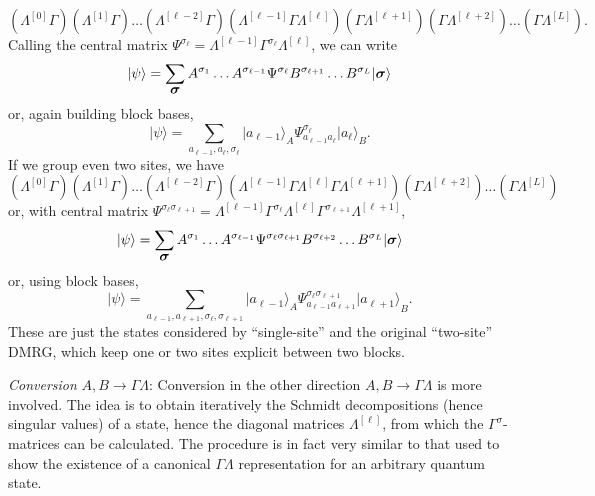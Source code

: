 \documentclass[a4paper,10pt,oneside,onecolumn,1p,times]{elsarticle}
\newcommand{\ket}[1]{\mbox{$| #1  \rangle$}}
\newcommand{\fat}[1]{\mbox{\boldmath$#1$\unboldmath}}	%
\begin{document}
\begin{equation}
(\Lambda^{[0]}\Gamma)(\Lambda^{[1]}\Gamma)\ldots(\Lambda^{[\ell-2]}\Gamma)(\Lambda^{[\ell-1]}\Gamma \Lambda^{[\ell]}) (\Gamma\Lambda^{[\ell+1]})(\Gamma\Lambda^{[\ell+2]}) \ldots (\Gamma\Lambda^{[L]}) .
\end{equation}
Calling the central matrix $\Psi^{\sigma_\ell}= \Lambda^{[\ell-1]}\Gamma^{\sigma_\ell} \Lambda^{[\ell]}$, we can write 
\begin{equation}
\ket{\psi} = \sum_{\fat{\sigma}} A^{\sigma_1} \ldots A^{\sigma_{\ell-1}} \Psi^{\sigma_\ell} B^{\sigma_{\ell+1}} \ldots B^{\sigma_L}
\ket{\fat{\sigma}}
\end{equation}
or, again building block bases,
\begin{equation}
\ket{\psi} = \sum_{a_{\ell-1},a_{\ell},\sigma_\ell} \ket{a_{\ell-1}}_A \Psi^{\sigma_\ell}_{a_{\ell-1}a_\ell} \ket{a_\ell}_B .
\end{equation}
If we group even two sites, we have
\begin{equation}
(\Lambda^{[0]}\Gamma)(\Lambda^{[1]}\Gamma)\ldots(\Lambda^{[\ell-2]}\Gamma)(\Lambda^{[\ell-1]}\Gamma \Lambda^{[\ell]} \Gamma\Lambda^{[\ell+1]})(\Gamma\Lambda^{[\ell+2]}) \ldots (\Gamma\Lambda^{[L]}) 
\end{equation}
or, with central matrix $\Psi^{\sigma_\ell \sigma_{\ell+1}}=\Lambda^{[\ell-1]}\Gamma^{\sigma_\ell} \Lambda^{[\ell]} \Gamma^{\sigma_{\ell+1}}\Lambda^{[\ell+1]}$,
\begin{equation}
\ket{\psi} = \sum_{\fat{\sigma}} A^{\sigma_1} \ldots A^{\sigma_{\ell-1}} \Psi^{\sigma_\ell \sigma_{\ell+1}} B^{\sigma_{\ell+2}} \ldots B^{\sigma_L} \ket{\fat{\sigma}}
\end{equation}
or, using block bases,
\begin{equation}
\ket{\psi} = \sum_{a_{\ell-1},a_{\ell+1},\sigma_\ell,\sigma_{\ell+1}} \ket{a_{\ell-1}}_A \Psi^{\sigma_\ell \sigma_{\ell+1}}_{a_{\ell-1}a_{\ell+1}} \ket{a_{\ell+1}}_B .
\end{equation}
These are just the states considered by ``single-site'' and the original ``two-site'' DMRG, which keep one or two sites explicit between two blocks.

{\em Conversion} $A,B \rightarrow \Gamma\Lambda$: Conversion in the other direction $A,B \rightarrow \Gamma\Lambda$ is more involved. The idea is to obtain iteratively the Schmidt decompositions (hence singular values) of a state, hence the diagonal matrices $\Lambda^{[\ell]}$, from which the $\Gamma^{\sigma}$-matrices can be calculated. The procedure is in fact very similar to that used to show the existence of a canonical $\Gamma\Lambda$ representation for an arbitrary quantum state.
\end{document}
